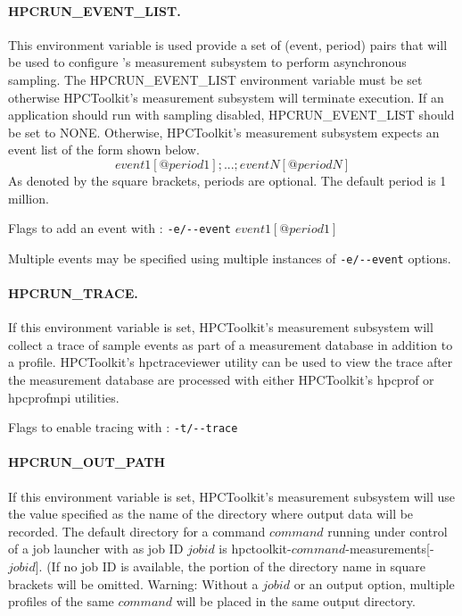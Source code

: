 \paragraph{HPCRUN\_EVENT\_LIST.}

This environment variable is used provide a set of (event, period)
pairs that will be used to configure \HPCToolkit's measurement subsystem to perform 
asynchronous sampling.  The HPCRUN\_EVENT\_LIST environment variable
must be set otherwise HPCToolkit's measurement subsystem will terminate
execution. If an application should run with sampling disabled,
HPCRUN\_EVENT\_LIST should be set to NONE. Otherwise, HPCToolkit's
measurement subsystem expects an event list of the form shown below.
$$event1[@period1];...;eventN[@periodN]$$ As denoted by the
square brackets, periods are optional. The default period is 1
million.

\parg
Flags to add an event with \hpcrun: \verb|-e/--event| $event1[@period1]$ 

\parg
Multiple events may be specified using multiple instances of \verb|-e/--event| options.

\paragraph{HPCRUN\_TRACE.}

If this environment variable is set, HPCToolkit's measurement
subsystem will collect a trace of sample events as part of a measurement
database in addition to a profile. HPCToolkit's hpctraceviewer
utility can be used to view the trace after the measurement database
are processed with either HPCToolkit's hpcprof or hpcprofmpi
utilities.

\parg
Flags to enable tracing with \hpcrun: \verb|-t/--trace|

\paragraph{HPCRUN\_OUT\_PATH}

If this environment variable is set, HPCToolkit's measurement subsystem
will use the value specified as the name of the directory where
output data will be recorded. The default directory for a command
$command$ running under control of a job launcher with as job ID
$jobid$ is hpctoolkit-$command$-measurements[-$jobid$]. (If no
job ID is available, the portion of the directory name in square
brackets will be omitted. Warning: Without a $jobid$ or an output
option, multiple profiles of the same $command$ will be placed
in the same output directory.

